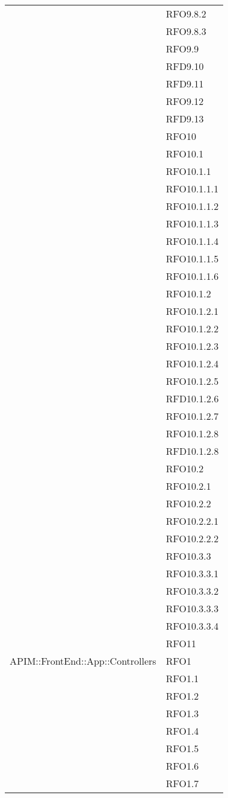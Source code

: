 \begin{longtable}{ p{12cm} | p{4cm} }
			& RFO9.8.2 \\
			& RFO9.8.3 \\
			& RFO9.9 \\
			& RFD9.10 \\
			& RFD9.11 \\
			& RFO9.12 \\
			& RFD9.13 \\
			& RFO10 \\
			& RFO10.1 \\
			& RFO10.1.1 \\
			& RFO10.1.1.1 \\
			& RFO10.1.1.2 \\
			& RFO10.1.1.3 \\
			& RFO10.1.1.4 \\
			& RFO10.1.1.5 \\
			& RFO10.1.1.6 \\
			& RFO10.1.2 \\
			& RFO10.1.2.1 \\
			& RFO10.1.2.2 \\
			& RFO10.1.2.3 \\
			& RFO10.1.2.4 \\
			& RFO10.1.2.5 \\
			& RFD10.1.2.6 \\
			& RFO10.1.2.7 \\
			& RFO10.1.2.8 \\
			& RFD10.1.2.8 \\
			& RFO10.2 \\
			& RFO10.2.1 \\
			& RFO10.2.2 \\
			& RFO10.2.2.1 \\
			& RFO10.2.2.2 \\
			& RFO10.3.3 \\
			& RFO10.3.3.1 \\
			& RFO10.3.3.2 \\
			& RFO10.3.3.3 \\
			& RFO10.3.3.4 \\
			& RFO11 \\
			\hline
			APIM::FrontEnd::App::Controllers
			& RFO1 \\
			& RFO1.1 \\
			& RFO1.2 \\
			& RFO1.3 \\
			& RFO1.4 \\
			& RFO1.5 \\
			& RFO1.6 \\
			& RFO1.7 \\

\end{longtable}
